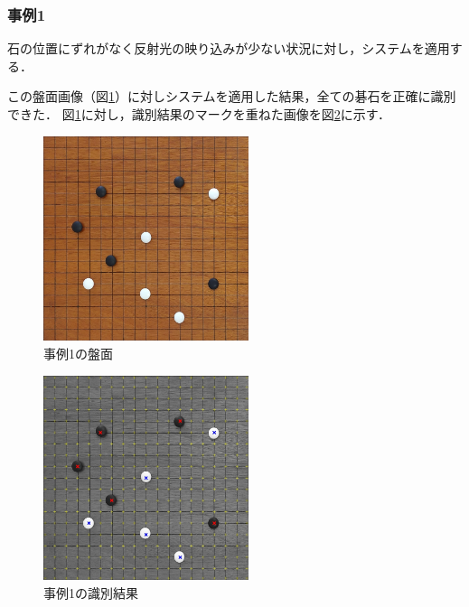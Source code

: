 \documentclass[openright]{nitocs}
\numberwithin{equation}{section}
\begin{document}
            \subsubsection{事例1}
                石の位置にずれがなく反射光の映り込みが少ない状況に対し，システムを適用する．

                この盤面画像（図\ref{ex1}）に対しシステムを適用した結果，全ての碁石を正確に識別できた．
                図\ref{ex1}に対し，識別結果のマークを重ねた画像を図\ref{ex1_result}に示す．
                \begin{figure}[tb] %
                    \begin{center}
                    \includegraphics[clip,width=60mm]{DSC_0041/boardImg.jpg} 
                    \caption{事例1の盤面}
                    \label{ex1}
                    \end{center}
                \end{figure}

                \begin{figure}[tb] %
                    \begin{center}
                    \includegraphics[clip,width=60mm]{DSC_0041/result.jpg} 
                    \caption{事例1の識別結果}
                    \label{ex1_result}
                    \end{center}
                \end{figure}
\end{document}
